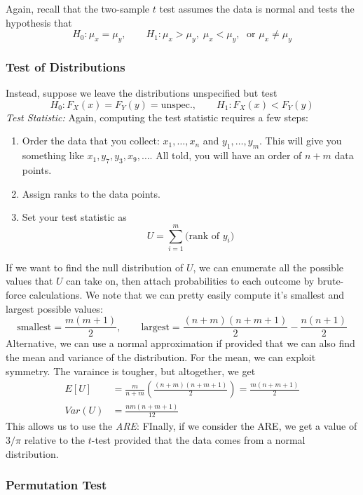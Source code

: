 \documentclass[a4paper,12pt]{scrartcl}
\begin{document}
Again, recall that the two-sample $t$ test assumes the data is normal
and tests the hypothesis that
   \[ H_0: \mu_x = \mu_y, \qquad H_1: \mu_x > \mu_y,\; \mu_x < \mu_y,\;
      \text{ or }\mu_x \neq \mu_y \]

\subsubsection{Test of Distributions}

Instead, suppose we leave the distributions unspecified but test
   \[ H_0: F_X(x) = F_Y(y) = \text{unspec.}, \qquad
      H_1: F_X(x) < F_Y(y) \]
{\sl Test Statistic:} Again, computing the test statistic requires
a few steps:
\begin{enumerate}
   \item Order the data that you collect: $x_1, \ldots, x_n$ and
      $y_1, \ldots, y_m$. This will give you something like
      $x_1, y_7, y_3, x_9, \ldots$.  All told, you will have an order
      of $n+m$ data points.
   \item Assign ranks to the data points.
   \item Set your test statistic as
      \[ U = \sum^m_{i=1} \text{(rank of $y_i$)} \]
\end{enumerate}
If we want to find the null distribution of $U$, we can
enumerate all the possible values that $U$ can take on, then attach
probabilities to each outcome by brute-force calculations.
We note that
we can pretty easily compute it's smallest and largest possible values:
   \[ \text{smallest} = \frac{m(m+1)}{2}, \qquad \text{largest} =
      \frac{(n+m)(n+m+1)}{2} - \frac{n(n+1)}{2} \]
Alternative, we can use a normal approximation if provided that
we can also find the mean and variance of the distribution.
For the mean, we can exploit symmetry. The varaince is tougher, but
altogether, we get
\begin{align*}
    E[U] &= \frac{m}{n+m} \left( \frac{(n+m)(n+m+1)}{2}\right) =
      \frac{m(n+m+1)}{2} \\
   Var(U) &= \frac{nm(n+m+1)}{12}
\end{align*}
This allows us to use the
{\sl ARE}: FInally, if we consider the ARE, we get a value of $3/\pi$
relative to the $t$-test provided that the data comes from a normal
distribution.

\newpage

\subsubsection{Permutation Test}
\end{document}
